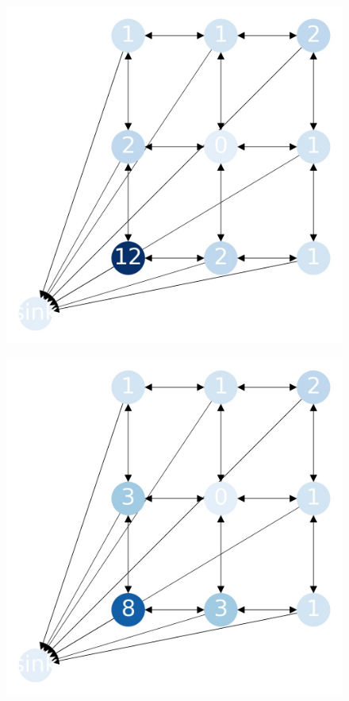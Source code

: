 \documentclass{beamer}
\begin{document}
    \begin{frame}
      \begin{figure}[h!]
        \centering
          \includegraphics[scale=0.25]{sandpile_-28}
      \end{figure}
    \end{frame}
    

    \begin{frame}
      \begin{figure}[h!]
        \centering
          \includegraphics[scale=0.25]{sandpile_-29}
      \end{figure}
    \end{frame}
    
\end{document}
